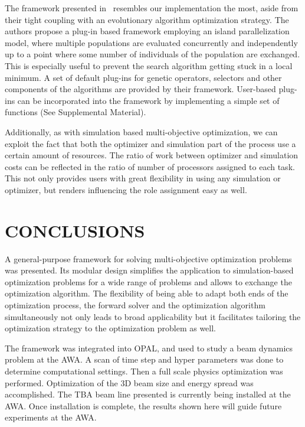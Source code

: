 \documentclass[preprint,linenumbers,amsmath,amssymb,aps,prstab]{revtex4-1}%
\begin{document}
The framework presented in~\cite{lems:09} resembles our implementation the
  most, aside from their tight coupling with an evolutionary algorithm
  optimization strategy.
The authors propose a plug-in based framework employing an island
  parallelization model, where multiple populations are evaluated concurrently
  and independently up to a point where some number of individuals of the
  population are exchanged.
This is especially useful to prevent the search algorithm getting stuck in
  a local minimum.
A set of default plug-ins for genetic operators, selectors and other
  components of the algorithms are provided by their framework.
User-based plug-ins can be incorporated into the framework by implementing a
  simple set of functions (See Supplemental Material).

Additionally, as with simulation based multi-objective optimization, we can
  exploit the fact that both the optimizer and simulation part of the process
  use a certain amount of resources.
The ratio of work between optimizer and simulation costs can be reflected in
  the ratio of number of processors assigned to each task.
This not only provides users with  great flexibility in using any simulation
  or optimizer, but renders influencing the role assignment easy as well.

 

\section{CONCLUSIONS} \label{sec:conclusions}

A general-purpose framework for solving multi-objective
  optimization problems was presented.
Its modular design simplifies the application to simulation-based optimization
  problems for a wide range of problems and allows to exchange the
  optimization algorithm.
The flexibility of being able to adapt both ends of the optimization
  process, the forward solver and the optimization algorithm simultaneously
  not only leads to broad applicability but it facilitates
  tailoring the optimization strategy to the optimization problem as well.

The framework was integrated into OPAL, and used 
to study a beam dynamics problem at the AWA.
A scan of time step and hyper parameters was done to determine computational settings.
Then a full scale physics optimization was performed.
Optimization of the 3D beam size and energy spread was accomplished.
The TBA beam line presented is currently being installed at the AWA.
Once installation is complete, the results shown here will guide future experiments at the AWA.
\end{document}
